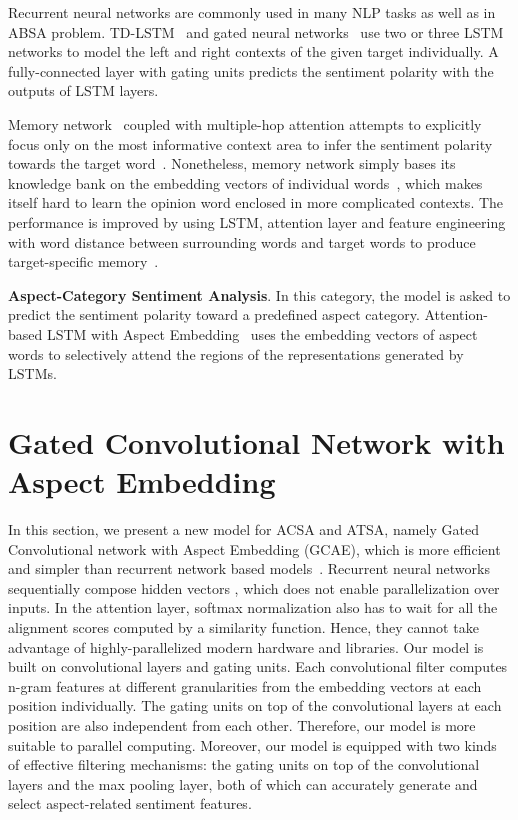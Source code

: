 \documentclass[11pt,a4paper]{article}
\begin{document}
Recurrent neural networks are commonly used in many NLP tasks as well as in ABSA problem. TD-LSTM~\cite{Tang:2016th} and gated neural networks~\cite{Zhang:2016th} use two or three LSTM networks to model the left and right contexts of the given target individually. A fully-connected layer with gating units predicts the sentiment polarity with the outputs of LSTM layers. 


Memory network~\cite{Weston:2014va} coupled with multiple-hop attention attempts to explicitly focus only on the most informative context area to infer the sentiment polarity towards the target word~\cite{Tang:2016uz,Chen:2017wv}. Nonetheless, memory network simply bases its knowledge bank on the embedding vectors of individual words~\cite{Tang:2016uz}, which makes itself hard to learn the opinion word enclosed in more complicated contexts. The performance is improved by using LSTM, attention layer and feature engineering with word distance between surrounding words and target words to produce target-specific memory~\cite{Chen:2017wv}.

\textbf{Aspect-Category Sentiment Analysis}. In this category, the model is asked to predict the sentiment polarity toward a predefined aspect category. Attention-based LSTM with Aspect Embedding~\cite{Wang:2016tf} uses the embedding vectors of aspect words to selectively attend the regions of the representations generated by LSTMs.

\section{Gated Convolutional Network with Aspect Embedding}
In this section, we present a new model for ACSA and ATSA, namely Gated Convolutional network with Aspect Embedding (GCAE), which is more efficient and simpler than recurrent network based models~\cite{Wang:2016tf,Tang:2016th,Ma:2017jo,Chen:2017wv}.
Recurrent neural networks sequentially compose hidden vectors , which does not enable parallelization over inputs. In the attention layer, softmax normalization also has to wait for all the alignment scores computed by a similarity function. 
Hence, they cannot take advantage of highly-parallelized modern hardware and libraries.
Our model is built on convolutional layers and gating units. Each convolutional filter computes n-gram features at different granularities from the embedding vectors at each position individually. The gating units on top of the convolutional layers at each position are also independent from each other. Therefore, our model is more suitable to parallel computing. 
Moreover, our model is equipped with two kinds of effective filtering mechanisms: the gating units on top of the convolutional layers and the max pooling layer, both of which can accurately generate and select aspect-related sentiment features.
\end{document}
